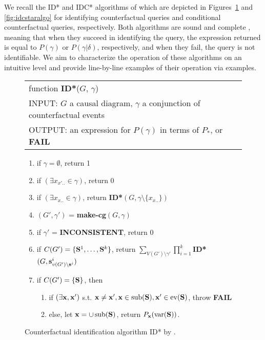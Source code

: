 We recall the ID* and IDC* algorithms of \citet{shpitser2007} which are depicted in Figures~\ref{fig:idstaralgo} and \ref{fig:idcstaralgo} for identifying counterfactual queries and conditional counterfactual queries, respectively. Both algorithms are sound and complete \citep[Theorems 26 and 31]{shpitser2008}, meaning that when they succeed in identifying the query, the expression returned is equal to \(P(\gamma)\) or \(P(\gamma|\delta)\), respectively, and when they fail, the query is not identifiable. We aim to characterize the operation of these algorithms on an intuitive level and provide line-by-line examples of their operation via examples.

\begin{figure}[ht]
\begin{center}
  \begin{tabular}{l}
    function \textbf{ID*}(\(G\), \(\gamma\)) \\
    INPUT: \(G\) a causal diagram, \(\gamma\)  a conjunction of counterfactual events\\
    OUTPUT: an expression for \(P(\gamma)\) in terms of \(P_*\), or \textbf{FAIL}
  \end{tabular}
  \begin{minipage}{.80\textwidth}
  \vspace*{0.25cm}
  \begin{enumerate}
    \item if \(\gamma = \emptyset\), return 1
    \item if \((\exists x_{x'..} \in \gamma)\), return 0
    \item if \((\exists x_{x..} \in \gamma)\), return \textbf{ID*}\((G, \gamma \setminus \{x_{x..}\})\)
    \item \((G', \gamma')\) = \textbf{make-cg}\((G, \gamma)\)
    \item if \(\gamma'\) = \textbf{INCONSISTENT}, return 0
    \item if \(C(G') = \{\mathbf{S}^1, \ldots, \mathbf{S}^k\}\), return \(\sum_{V(G')\setminus \gamma'} \prod_{i=1}^k\)\textbf{ID*}\((G, \mathbf{s}^i_{v(G')\setminus \mathbf{s}^i})\)
    \item if \(C(G') = \{\mathbf{S}\}\), then
    \addtocounter{enumi}{1}
    \begin{enumerate}[label=\arabic*.,start=\value{enumi}]
      \item if \((\exists \mathbf{x}, \mathbf{x}')\) s.t. \(\mathbf{x} \neq \mathbf{x}', \mathbf{x} \in \mathrm{sub}(\mathbf{S}), \mathbf{x}' \in \mathrm{ev}(\mathbf{S})\), throw \textbf{FAIL}
      \item else, let \(\mathbf{x} =  \cup\,\mathrm{sub}(\mathbf{S})\), return \(P_{\mathbf{x}}(\mathrm{var}(\mathbf{S}))\).
    \end{enumerate}
  \end{enumerate}
  \end{minipage}
\end{center}
\caption{Counterfactual identification algorithm ID* by \citet{shpitser2007}.}
\label{fig:idstaralgo}
\end{figure}

